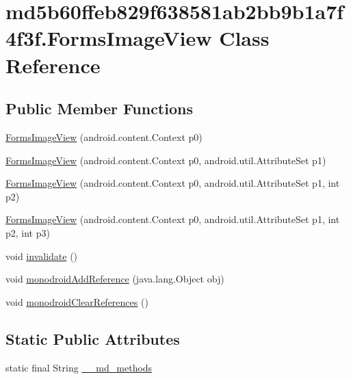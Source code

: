 \hypertarget{classmd5b60ffeb829f638581ab2bb9b1a7f4f3f_1_1_forms_image_view}{
\section{md5b60ffeb829f638581ab2bb9b1a7f4f3f.FormsImageView Class Reference}
\label{classmd5b60ffeb829f638581ab2bb9b1a7f4f3f_1_1_forms_image_view}
}
\subsection*{Public Member Functions}
\begin{CompactItemize}
\item 
\hyperlink{classmd5b60ffeb829f638581ab2bb9b1a7f4f3f_1_1_forms_image_view_ee489db3f6d7a8dfa9800139a04eaeda}{FormsImageView} (android.content.Context p0)
\item 
\hyperlink{classmd5b60ffeb829f638581ab2bb9b1a7f4f3f_1_1_forms_image_view_8ba0beff3d66206db1bb62532722d902}{FormsImageView} (android.content.Context p0, android.util.AttributeSet p1)
\item 
\hyperlink{classmd5b60ffeb829f638581ab2bb9b1a7f4f3f_1_1_forms_image_view_65c516e6939a16b2841dc673bd36a971}{FormsImageView} (android.content.Context p0, android.util.AttributeSet p1, int p2)
\item 
\hyperlink{classmd5b60ffeb829f638581ab2bb9b1a7f4f3f_1_1_forms_image_view_c4e4d979e4813af986f532bf966d2c41}{FormsImageView} (android.content.Context p0, android.util.AttributeSet p1, int p2, int p3)
\item 
void \hyperlink{classmd5b60ffeb829f638581ab2bb9b1a7f4f3f_1_1_forms_image_view_e6e31fe48b36ca1c798beed0dae7f507}{invalidate} ()
\item 
void \hyperlink{classmd5b60ffeb829f638581ab2bb9b1a7f4f3f_1_1_forms_image_view_80b45cf11c7131a04bd92ebaebbc6a12}{monodroidAddReference} (java.lang.Object obj)
\item 
void \hyperlink{classmd5b60ffeb829f638581ab2bb9b1a7f4f3f_1_1_forms_image_view_2801900ce9e0aca76fb2360c2830ecba}{monodroidClearReferences} ()
\end{CompactItemize}
\subsection*{Static Public Attributes}
\begin{CompactItemize}
\item 
static final String \hyperlink{classmd5b60ffeb829f638581ab2bb9b1a7f4f3f_1_1_forms_image_view_25caf4e2fd079c6fac24434fed5d06d0}{\_\-\_\-md\_\-methods}
\end{CompactItemize}
